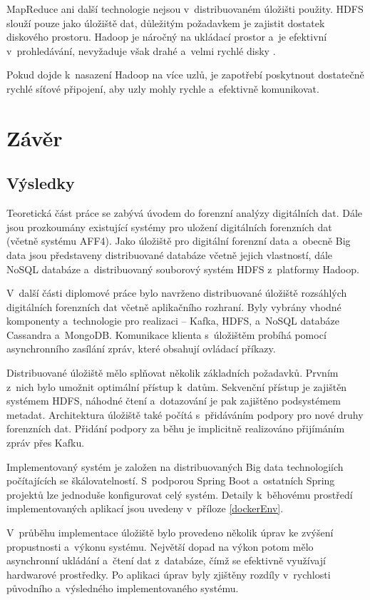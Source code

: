 MapReduce ani další technologie nejsou v~distribuovaném úložišti použity. HDFS slouží pouze jako úložiště dat, důležitým požadavkem je zajistit dostatek diskového prostoru. Hadoop je náročný na ukládací prostor a~je efektivní v~prohledávání, nevyžaduje však drahé a~velmi rychlé disky \cite{bestPracticesHadoopHW}.

Pokud dojde k~nasazení Hadoop na více uzlů, je zapotřebí poskytnout dostatečně rychlé síťové připojení, aby uzly mohly rychle a~efektivně komunikovat.

\chapter{Závěr}

\section{Výsledky}
Teoretická část práce se zabývá úvodem do forenzní analýzy digitálních dat. Dále jsou prozkoumány existující systémy pro uložení digitálních forenzních dat (včetně systému AFF4). Jako úložiště pro digitální forenzní data a~obecně Big data jsou představeny distribuované databáze včetně jejich vlastností, dále NoSQL databáze a~distribuovaný souborový systém HDFS z~platformy Hadoop.

V~další části diplomové práce bylo navrženo distribuované úložiště rozsáhlých digitálních forenzních dat včetně aplikačního rozhraní. Byly vybrány vhodné komponenty a~technologie pro realizaci -- Kafka, HDFS, a~NoSQL databáze Cassandra a~MongoDB. Komunikace klienta s~úložištěm probíhá pomocí asynchronního zasílání zpráv, které obsahují ovládací příkazy.

Distribuované úložiště mělo splňovat několik základních požadavků. Prvním z~nich bylo umožnit optimální přístup k~datům. Sekvenční přístup je zajištěn systémem HDFS, náhodné čtení a~dotazování je pak zajištěno podsystémem metadat.
Architektura úložiště také počítá s~přidáváním podpory pro nové druhy forenzních dat. Přidání podpory za běhu je implicitně realizováno přijímáním zpráv přes Kafku.

Implementovaný systém je založen na distribuovaných Big data technologiích počítajících se škálovatelností. S~podporou Spring Boot a~ostatních Spring projektů lze jednoduše konfigurovat celý systém. Detaily k~běhovému prostředí implementovaných aplikací jsou uvedeny v~příloze \ref{dockerEnv}.

V~průběhu implementace úložiště bylo provedeno několik úprav ke zvýšení propustnosti a~výkonu systému. Největší dopad na výkon potom mělo asynchronní ukládání a~čtení dat z~databáze, čímž se efektivně využívají hardwarové prostředky. Po aplikaci úprav byly zjištěny rozdíly v~rychlosti původního a~výsledného implementovaného systému.

